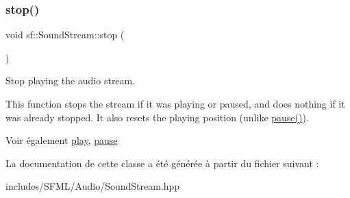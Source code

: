 \subsubsection{\texorpdfstring{stop()}{stop()}}
{\footnotesize\ttfamily void sf\+::\+Sound\+Stream\+::stop (\begin{DoxyParamCaption}{ }\end{DoxyParamCaption})}



Stop playing the audio stream. 

This function stops the stream if it was playing or paused, and does nothing if it was already stopped. It also resets the playing position (unlike \hyperlink{classsf_1_1SoundStream_a932ff181e661503cad288b4bb6fe45ca}{pause()}).

\begin{DoxySeeAlso}{Voir également}
\hyperlink{classsf_1_1SoundStream_afdc08b69cab5f243d9324940a85a1144}{play}, \hyperlink{classsf_1_1SoundStream_a932ff181e661503cad288b4bb6fe45ca}{pause} 
\end{DoxySeeAlso}


La documentation de cette classe a été générée à partir du fichier suivant \+:\begin{DoxyCompactItemize}
\item 
includes/\+S\+F\+M\+L/\+Audio/Sound\+Stream.\+hpp\end{DoxyCompactItemize}
